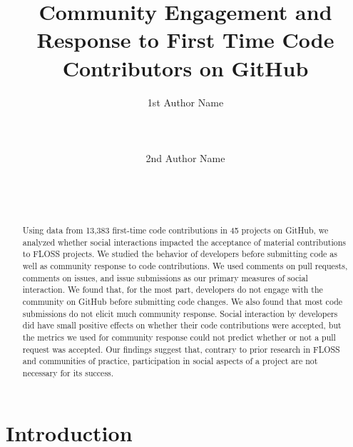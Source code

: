 \documentclass{sigchi}
\begin{document}
\title{Community Engagement and Response to First Time Code Contributors on 
GitHub}

\author{
  \alignauthor 1st Author Name\\
    \\
    \\
    \\
  \alignauthor 2nd Author Name\\
    \\
    \\
    \\
}

\maketitle                %



\begin{abstract}           %
Using data from 13,383 first-time code contributions in 45 projects on GitHub, 
we analyzed whether social interactions impacted the acceptance of material 
contributions to FLOSS projects. We studied the behavior of developers before 
submitting code as well as community response to code contributions. We used 
comments on pull requests, comments on issues, and issue submissions as our 
primary measures of social interaction. We found that, for the most part, 
developers do not engage with the community on GitHub before submitting code 
changes. We also found that most code submissions do not elicit much community 
response. Social interaction by developers did have small positive effects on 
whether their code contributions were accepted, but the metrics we used for 
community response could not predict whether or not a pull request was 
accepted. Our findings suggest that, contrary to prior research in FLOSS and 
communities of practice, participation in social aspects of a project are not 
necessary for its success.
\end{abstract}

\section{Introduction}
\end{document}
